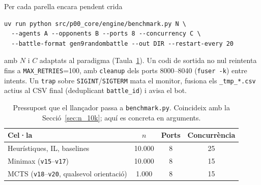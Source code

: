 Per cada parella encara pendent crida

\begin{verbatim}
uv run python src/p00_core/engine/benchmark.py N \
  --agents A --opponents B --ports 8 --concurrency C \
  --battle-format gen9randombattle --out DIR --restart-every 20
\end{verbatim}

amb $N$ i $C$ adaptats al paradigma (Taula~\ref{tab:launcher_budget}). Un codi de sortida no nul reintenta fins a \texttt{MAX\_RETRIES}=100, amb \texttt{cleanup} dels ports 8000--8040 (\texttt{fuser -k}) entre intents. Un \texttt{trap} sobre \texttt{SIGINT}/\texttt{SIGTERM} mata el monitor, fusiona els \texttt{\_tmp\_*.csv} actius al CSV final (deduplicant \texttt{battle\_id}) i avisa el bot.

\begin{table}[htbp]
    \centering
    \caption{Pressupost que el llançador passa a \texttt{benchmark.py}. Coincideix amb la Secció~\ref{sec:n_10k}; aquí es concreta en arguments.}
    \label{tab:launcher_budget}
    \small
    \begin{tabular}{lccc}
        \toprule
        \textbf{Cel·la} & $n$ & \textbf{Ports} & \textbf{Concurrència} \\
        \midrule
        Heurístiques, IL, baselines & 10.000 & 8 & 25 \\
        \arrayrulecolor{gray!30}\hline\arrayrulecolor{black}
        Minimax (\texttt{v15}--\texttt{v17}) & 10.000 & 8 & 15 \\
        \arrayrulecolor{gray!30}\hline\arrayrulecolor{black}
        MCTS (\texttt{v18}--\texttt{v20}, qualsevol orientació) & 1.000 & 8 & 15 \\
        \bottomrule
    \end{tabular}
\end{table}

